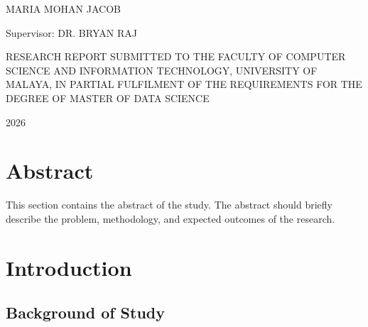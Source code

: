 \documentclass[12pt]{report}
\begin{document}
\begin{titlepage}
\centering

\vspace{2cm}

{\Huge \textbf {}}

\vspace{2cm}

{\Large MARIA MOHAN JACOB}

\vspace{1cm}

{\Large Supervisor: DR. BRYAN RAJ}

\vfill

{\Large
RESEARCH REPORT SUBMITTED TO THE FACULTY OF COMPUTER SCIENCE AND INFORMATION TECHNOLOGY, UNIVERSITY OF MALAYA, IN PARTIAL FULFILMENT OF THE REQUIREMENTS FOR THE DEGREE OF MASTER OF DATA SCIENCE
}

\vspace{3cm}

{\Large 2026}

\end{titlepage}
\newpage 


\newpage
\chapter{}

\chapter*{Abstract}

This section contains the abstract of the study. The abstract should briefly describe the problem, methodology, and expected outcomes of the research.

\tableofcontents
\newpage

\chapter{Introduction}

\section{Background of Study}
\end{document}
